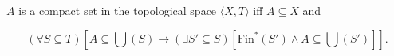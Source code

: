 $A$ is a compact set in the topological space $\langle X, T \rangle$ iff $A \subseteq X$ and

$$(\forall S \subseteq T) \left[ A \subseteq \bigcup (S) \rightarrow (\exists S' \subseteq S) \left[ \mathrm{Fin}^* (S') \wedge A \subseteq \bigcup (S') \right] \right].$$

